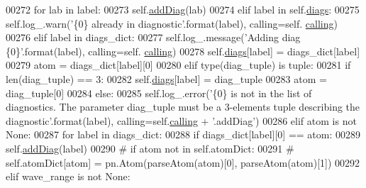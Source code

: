 \begin{DoxyCode}
00272             \textcolor{keywordflow}{for} lab \textcolor{keywordflow}{in} label:
00273                 self.\hyperlink{classpyneb_1_1core_1_1diags_1_1_diagnostics_a508fa9c5a2216f9eb4128338c33a6f75}{addDiag}(lab)
00274         \textcolor{keywordflow}{elif} label \textcolor{keywordflow}{in} self.\hyperlink{classpyneb_1_1core_1_1diags_1_1_diagnostics_a0c0f7e36097677f61a6a14a0c3127b02}{diags}:
00275             self.log\_.warn(\textcolor{stringliteral}{'\{0\} already in diagnostic'}.format(label), calling=self.
      \hyperlink{classpyneb_1_1core_1_1diags_1_1_diagnostics_a07dce673fec8b2383ef411ab94b0b2fe}{calling})
00276         \textcolor{keywordflow}{elif} label \textcolor{keywordflow}{in} diags\_dict:
00277             self.log\_.message(\textcolor{stringliteral}{'Adding diag \{0\}'}.format(label), calling=self.
      \hyperlink{classpyneb_1_1core_1_1diags_1_1_diagnostics_a07dce673fec8b2383ef411ab94b0b2fe}{calling})
00278             self.\hyperlink{classpyneb_1_1core_1_1diags_1_1_diagnostics_a0c0f7e36097677f61a6a14a0c3127b02}{diags}[label] = diags\_dict[label]
00279             atom = diags\_dict[label][0]
00280         \textcolor{keywordflow}{elif} type(diag\_tuple) \textcolor{keywordflow}{is} tuple:
00281             \textcolor{keywordflow}{if} len(diag\_tuple) == 3:    
00282                 self.\hyperlink{classpyneb_1_1core_1_1diags_1_1_diagnostics_a0c0f7e36097677f61a6a14a0c3127b02}{diags}[label] = diag\_tuple
00283                 atom = diag\_tuple[0]
00284             \textcolor{keywordflow}{else}:
00285                 self.log\_.error(\textcolor{stringliteral}{'\{0\} is not in the list of diagnostics. The parameter diag\_tuple must be a
       3-elements tuple describing the diagnostic'}.format(label), calling=self.\hyperlink{classpyneb_1_1core_1_1diags_1_1_diagnostics_a07dce673fec8b2383ef411ab94b0b2fe}{calling} + \textcolor{stringliteral}{'.addDiag'})
00286         \textcolor{keywordflow}{elif} atom \textcolor{keywordflow}{is} \textcolor{keywordflow}{not} \textcolor{keywordtype}{None}:
00287             \textcolor{keywordflow}{for} label \textcolor{keywordflow}{in} diags\_dict:
00288                 \textcolor{keywordflow}{if} diags\_dict[label][0] == atom:
00289                     self.\hyperlink{classpyneb_1_1core_1_1diags_1_1_diagnostics_a508fa9c5a2216f9eb4128338c33a6f75}{addDiag}(label)
00290 \textcolor{comment}{#                    if atom not in self.atomDict:}
00291 \textcolor{comment}{#                        self.atomDict[atom] = pn.Atom(parseAtom(atom)[0], parseAtom(atom)[1])}
00292         \textcolor{keywordflow}{elif} wave\_range \textcolor{keywordflow}{is} \textcolor{keywordflow}{not} \textcolor{keywordtype}{None}:

\end{DoxyCode}
